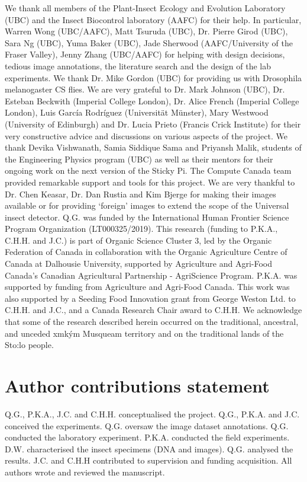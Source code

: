 \documentclass[12pt]{article}
\newcommand{\musqueam}{x\super{w}m\textschwa{}\texttheta{}k\super{w}\textschwa{}\'{y}\textschwa{}m}
\begin{document}
\begin{linenumbers}
{			We thank all members of the Plant-Insect Ecology and Evolution Laboratory (UBC) and the Insect Biocontrol laboratory (AAFC) for their help. In particular, Warren Wong (UBC/AAFC), Matt Tsuruda (UBC), Dr. Pierre Girod (UBC), Sara Ng (UBC), Yuma Baker (UBC), Jade Sherwood (AAFC/University of the Fraser Valley), Jenny Zhang (UBC/AAFC) for helping with design decisions, tedious image annotations, the literature search and the design of the lab experiments. We thank Dr. Mike Gordon (UBC) for providing us with Drosophila melanogaster CS flies. We are very grateful to Dr. Mark Johnson (UBC), Dr. Esteban Beckwith (Imperial College London), Dr. Alice French (Imperial College London), Luis García Rodríguez (Universität Münster), Mary Westwood (University of Edinburgh) and Dr. Lucia Prieto (Francis Crick Institute) for their very constructive advice and discussions on various aspects of the project. We thank Devika Vishwanath, Samia Siddique Sama and Priyansh Malik, students of the Engineering Physics program (UBC) as well as their mentors for their ongoing work on the next version of the Sticky Pi. The Compute Canada team provided remarkable support and tools for this project. 
			We are very thankful to Dr. Chen Keasar, 
			Dr. Dan Rustia \cite{rustia_application_2020}and 
			Kim Bjerge\cite{bjerge_automated_2021}
			for making their images available 
			or for providing `foreign' images to extend the scope of the Universal insect detector.
			Q.G. was funded by the International Human Frontier Science Program Organization (LT000325/2019). This research (funding to P.K.A., C.H.H. and J.C.) is part of Organic Science Cluster 3, led by the Organic Federation of Canada in collaboration with the Organic Agriculture Centre of Canada at Dalhousie University, supported by Agriculture and Agri-Food Canada’s Canadian Agricultural Partnership - AgriScience Program. P.K.A. was supported by funding from Agriculture and Agri-Food Canada. This work was also supported by a Seeding Food Innovation grant from George Weston Ltd. to C.H.H. and J.C., and a Canada Research Chair award to C.H.H. We acknowledge that some of the research described herein occurred on the traditional, ancestral, and unceded \musqueam{} Musqueam territory and on the traditional lands of the Sto:lo people.}

		\section*{Author contributions statement}
		Q.G., P.K.A., J.C.  and  C.H.H. conceptualised the project.
		Q.G., P.K.A. and J.C. conceived the experiments.
		Q.G. oversaw the image dataset annotations.
		Q.G. conducted the laboratory experiment. 
		P.K.A. conducted the field experiments.
		D.W. characterised the insect specimens (DNA and images).
		Q.G. analysed the results.
		J.C. and C.H.H contributed to supervision and funding acquisition.
		All authors wrote and reviewed the manuscript. 


\end{linenumbers}
\end{document}
